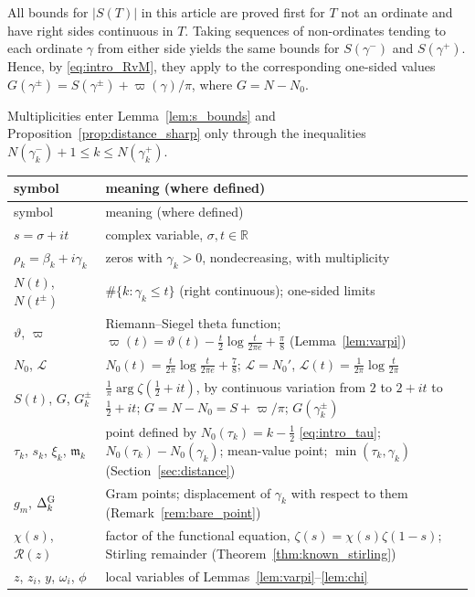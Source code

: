 \documentclass[11pt,a4paper]{article}
\makeatletter
\numberwithin{equation}{section}
\DeclareRobustCommand{\CGref}[1]{\ref{#1}}
\DeclareRobustCommand{\CGeqref}[1]{\eqref{#1}}
\let\CG@origref\ref
\let\CG@origeqref\eqref
\newcommand{\CG@gettip}[1]{\@ifundefined{CGTip@#1}{#1}{\csname CGTip@#1\endcsname}}
\DeclareRobustCommand{\CGref}[1]{\pdftooltip{\CG@origref{#1}}{\CG@gettip{#1}}}
\DeclareRobustCommand{\CGeqref}[1]{\pdftooltip{\CG@origeqref{#1}}{\CG@gettip{#1}}}
\theoremstyle{definition}
\theoremstyle{remark}
\newcommand{\Nz}{N_0} %
\newcommand{\lL}{\mathcal L}
\newcommand{\R}{\mathbb R}
\makeatother
\begin{document}
All bounds for $|S(T)|$ in this article are proved first for $T$ not an ordinate and have right sides continuous in $T$. Taking sequences of non-ordinates tending to each ordinate $\gamma$ from either side yields the same bounds for $S(\gamma^-)$ and $S(\gamma^+)$. Hence, by \CGeqref{eq:intro_RvM}, they apply to the corresponding one-sided values $G(\gamma^\pm)=S(\gamma^\pm)+\varpi(\gamma)/\pi$, where $G=N-\Nz$.

Multiplicities enter Lemma~\CGref{lem:s_bounds} and Proposition~\CGref{prop:distance_sharp} only through the inequalities $N(\gamma_k^-)+1\le k\le N(\gamma_k^+)$.

\begin{center}\small
\begin{longtable}{p{}p{}}
\toprule symbol & meaning (where defined)\\\midrule\endfirsthead
\toprule symbol & meaning (where defined)\\\midrule\endhead
\bottomrule\endfoot
$s=\sigma+it$ & complex variable, $\sigma,t\in\R$\\
$\rho_k=\beta_k+i\gamma_k$ & zeros with $\gamma_k>0$, nondecreasing, with multiplicity\\
$N(t)$, $N(t^\pm)$ & $\#\{k:\gamma_k\le t\}$ (right continuous); one-sided limits\\
$\vartheta$, $\varpi$ & Riemann--Siegel theta function; $\varpi(t)=\vartheta(t)-\frac t2\log\frac t{2\pi e}+\frac\pi8$ (Lemma~\CGref{lem:varpi})\\
$\Nz$, $\lL$ & $\Nz(t)=\frac t{2\pi}\log\frac t{2\pi e}+\frac78$; $\lL=\Nz'$, $\lL(t)=\frac1{2\pi}\log\frac t{2\pi}$\\
$S(t)$, $G$, $G_k^\pm$ & $\frac1\pi\arg\zeta(\frac12+it)$, by continuous variation from $2$ to $2+it$ to $\frac12+it$; $G=N-\Nz=S+\varpi/\pi$; $G(\gamma_k^\pm)$\\
$\tau_k$, $s_k$, $\xi_k$, $\mathfrak m_k$ & point defined by $\Nz(\tau_k)=k-\frac12$ \CGeqref{eq:intro_tau}; $\Nz(\tau_k)-\Nz(\gamma_k)$; mean-value point; $\min(\tau_k,\gamma_k)$ (Section~\CGref{sec:distance})\\
$g_m$, $\Delta^{\rm G}_k$ & Gram points; displacement of $\gamma_k$ with respect to them (Remark~\CGref{rem:bare_point})\\
$\chi(s)$, $\mathcal R(z)$ & factor of the functional equation, $\zeta(s)=\chi(s)\zeta(1-s)$; Stirling remainder (Theorem~\CGref{thm:known_stirling})\\
$z$, $z_i$, $y$, $\omega_i$, $\phi$ & local variables of Lemmas~\CGref{lem:varpi}--\CGref{lem:chi}\\

\end{longtable}
\end{center}
\end{document}
